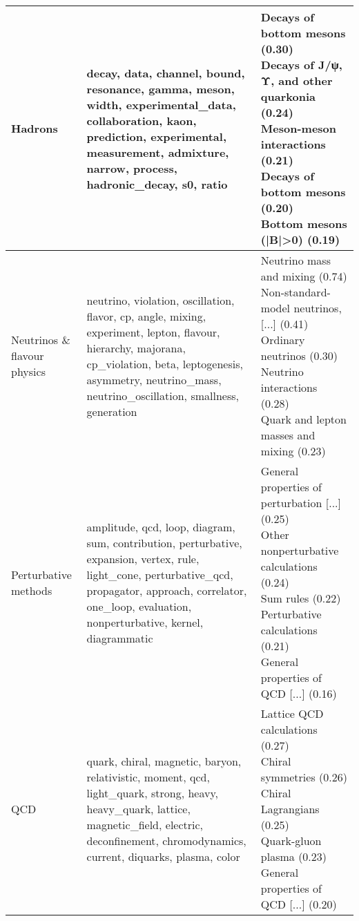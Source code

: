 \begin{longtable}{p{}|b{}|b{}}
                          Hadrons &                                                      decay, data, channel, bound, resonance, gamma, meson, width, experimental\_data, collaboration, kaon, prediction, experimental, measurement, admixture, narrow, process, hadronic\_decay, s0, ratio &                                                        \shortstack[l]{Decays of bottom mesons (0.30)\\ Decays of J/ψ, Υ, and other quarkonia (0.24)\\ Meson-meson interactions (0.21)\\ Decays of bottom mesons (0.20)\\ Bottom mesons (|B|>0) (0.19)}\\ \hline
     Neutrinos \& flavour physics &                                neutrino, violation, oscillation, flavor, cp, angle, mixing, experiment, lepton, flavour, hierarchy, majorana, cp\_violation, beta, leptogenesis, asymmetry, neutrino\_mass, neutrino\_oscillation, smallness, generation &                                                    \shortstack[l]{Neutrino mass and mixing (0.74)\\ Non-standard-model neutrinos, [...] (0.41)\\ Ordinary neutrinos (0.30)\\ Neutrino interactions (0.28)\\ Quark and lepton masses and mixing (0.23)}\\ \hline
             Perturbative methods &                                  amplitude, qcd, loop, diagram, sum, contribution, perturbative, expansion, vertex, rule, light\_cone, perturbative\_qcd, propagator, approach, correlator, one\_loop, evaluation, nonperturbative, kernel, diagrammatic &                                             \shortstack[l]{General properties of perturbation [...] (0.25)\\ Other nonperturbative calculations (0.24)\\ Sum rules (0.22)\\ Perturbative calculations (0.21)\\ General properties of QCD [...] (0.16)}\\ \hline
                              QCD &                                               quark, chiral, magnetic, baryon, relativistic, moment, qcd, light\_quark, strong, heavy, heavy\_quark, lattice, magnetic\_field, electric, deconfinement, chromodynamics, current, diquarks, plasma, color &                                                                            \shortstack[l]{Lattice QCD calculations (0.27)\\ Chiral symmetries (0.26)\\ Chiral Lagrangians (0.25)\\ Quark-gluon plasma (0.23)\\ General properties of QCD [...] (0.20)}\\ \hline

\end{longtable}
